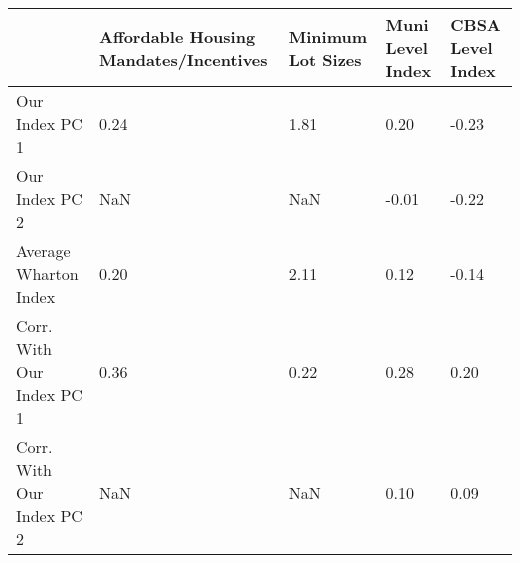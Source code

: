 \begin{tabular}{lp{5cm}p{4cm}p{4cm}p{4cm}}
\toprule
{} &  Affordable Housing Mandates/Incentives &  Minimum Lot Sizes &  Muni Level Index &  CBSA Level Index \\
\midrule
Our Index PC 1            &                                    0.24 &               1.81 &              0.20 &             -0.23 \\
Our Index PC 2            &                                     NaN &                NaN &             -0.01 &             -0.22 \\
Average Wharton Index     &                                    0.20 &               2.11 &              0.12 &             -0.14 \\
Corr. With Our Index PC 1 &                                    0.36 &               0.22 &              0.28 &              0.20 \\
Corr. With Our Index PC 2 &                                     NaN &                NaN &              0.10 &              0.09 \\
\bottomrule
\end{tabular}

